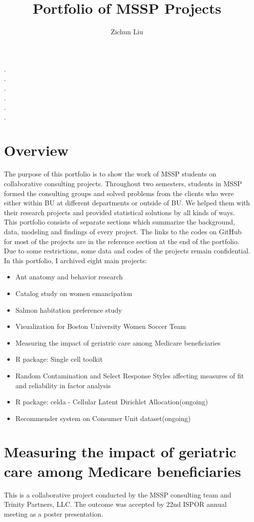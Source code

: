 \documentclass{article}
\title{Portfolio of MSSP Projects}
\author{Zichun Liu}
\begin{document}
	\maketitle
	\tableofcontents
	.\\
	.\\
	.\\
	.\\
	.\\
	.\\
	\section{Overview}
	The purpose of this portfolio is to show the work of MSSP students on collaborative consulting projects. Throughout two semesters, students in MSSP formed the consulting groups and solved problems from the clients who were either within BU at different departments or outside of BU. We helped them with their research projects and provided statistical solutions by all kinds of ways. This portfolio consists of separate sections which summarize the background, data, modeling and findings of every project. The links to the codes on GitHub for most of the projects are in the reference section at the end of the portfolio. Due to some restrictions, some data and codes of the projects remain confidential. In this portfolio, I archived eight main projects:
	\begin{itemize}
		\item Ant anatomy and behavior research
		\item Catalog study on women emancipation
		\item Salmon habitation preference study
		\item Visualization for Boston University Women Soccer Team
		\item Measuring the impact of geriatric care among Medicare beneficiaries
		\item R package: Single cell toolkit
		\item Random Contamination and Select Response Styles affecting measures of fit and reliability in factor analysis
		\item R package: celda - Cellular Latent Dirichlet Allocation(ongoing)
		\item Recommender system on Consumer Unit dataset(ongoing)		
	\end{itemize}

	\section{Measuring the impact of geriatric care among Medicare beneficiaries}
	This is a collaborative project conducted by the MSSP consulting team and Trinity Partners, LLC. The outcome was accepted by 22nd ISPOR annual meeting as a poster presentation. 
\end{document}
